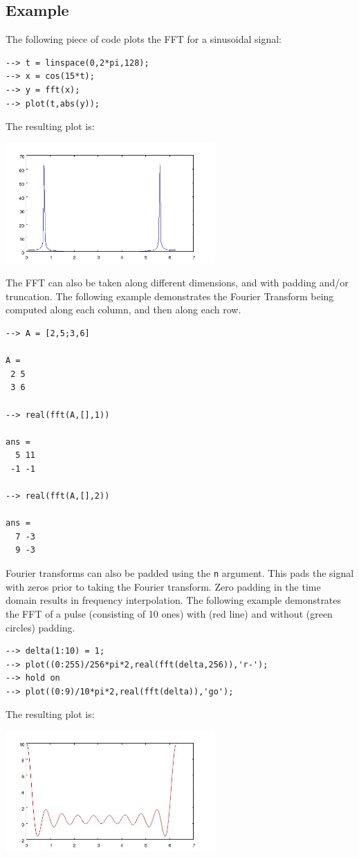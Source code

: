 \subsection{Example}

The following piece of code plots the FFT for a sinusoidal signal:
\begin{verbatim}
--> t = linspace(0,2*pi,128);
--> x = cos(15*t);
--> y = fft(x);
--> plot(t,abs(y));
\end{verbatim}
The resulting plot is:


\centerline{\includegraphics[width=8cm]{fft1}}


The FFT can also be taken along different dimensions, and with padding 
and/or truncation.  The following example demonstrates the Fourier
Transform being computed along each column, and then along each row.
\begin{verbatim}
--> A = [2,5;3,6]

A = 
 2 5 
 3 6 

--> real(fft(A,[],1))

ans = 
  5 11 
 -1 -1 

--> real(fft(A,[],2))

ans = 
  7 -3 
  9 -3 
\end{verbatim}
Fourier transforms can also be padded using the \verb|n| argument.  This
pads the signal with zeros prior to taking the Fourier transform.  Zero
padding in the time domain results in frequency interpolation.  The
following example demonstrates the FFT of a pulse (consisting of 10 ones)
with (red line) and without (green circles) padding.
\begin{verbatim}
--> delta(1:10) = 1;
--> plot((0:255)/256*pi*2,real(fft(delta,256)),'r-');
--> hold on
--> plot((0:9)/10*pi*2,real(fft(delta)),'go');
\end{verbatim}
The resulting plot is:


\centerline{\includegraphics[width=8cm]{fft2}}

